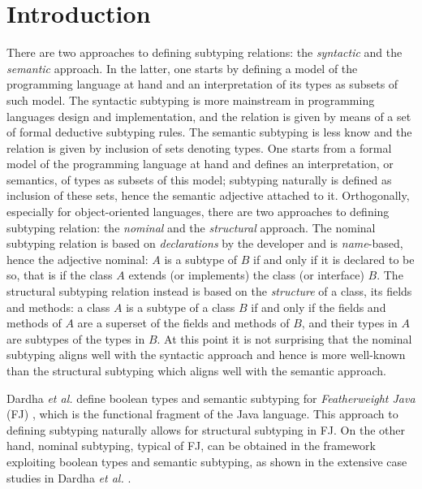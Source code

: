 \documentclass[runningheads]{llncs}
\begin{document}
\section{Introduction}
There are two approaches to defining subtyping relations: the \emph{syntactic} and the \emph{semantic} approach.
In the latter, one starts by defining a model of the programming language at hand and an interpretation of its types as subsets of such model.
The syntactic subtyping is more mainstream in programming languages design and implementation, and the relation is given by means of a set of formal deductive subtyping rules.
The semantic subtyping is less know and the relation is given by inclusion of sets denoting types. One starts from a formal model of the programming language at hand and defines an interpretation, or semantics, of types as subsets of this model; subtyping naturally is defined as inclusion of these sets, hence the semantic adjective attached to it.
Orthogonally, especially for object-oriented languages, there are two approaches to defining subtyping relation: the \emph{nominal} and the \emph{structural} approach.
The nominal subtyping relation is based on \emph{declarations} by the developer and is \emph{name}-based, hence the adjective nominal: $A$ is a subtype of $B$ if and only if it is declared to be so, that is if the class $A$ extends (or implements) the class (or interface) $B$.
The structural subtyping relation instead is based on the \emph{structure} of a class, its fields and methods: a class $A$ is a subtype of a class $B$ if and only if the fields and methods of $A$ are a superset of the fields and methods of $B$, and their types in $A$ are subtypes of the types in $B$.
At this point it is not surprising that the nominal subtyping aligns well with the syntactic approach and hence is more well-known than the structural subtyping which aligns well with the semantic approach.

Dardha \emph{et al.} \cite{Dardha2013,Dardha2017} define boolean types and semantic subtyping for \emph{Featherweight Java} (FJ) \cite{featherweight}, which is the functional fragment of the Java language.
This approach to defining subtyping naturally allows for structural subtyping in FJ.
On the other hand, nominal subtyping, typical of FJ, can be obtained in the framework exploiting boolean types and semantic subtyping, as shown in the extensive case studies in Dardha \emph{et al.} \cite[\S 8.4]{Dardha2017}.
\end{document}
